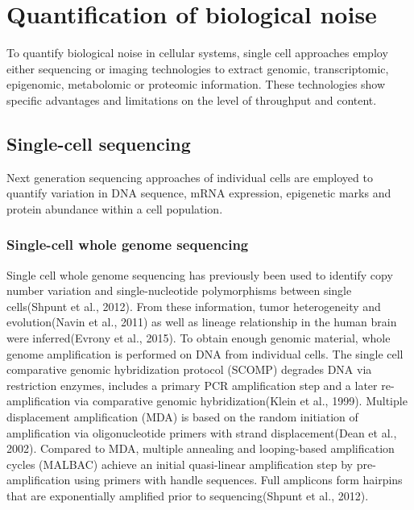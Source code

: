 
\section{Quantification of biological noise} 

To quantify biological noise in cellular systems, single cell approaches employ either sequencing or imaging technologies to extract genomic, transcriptomic, epigenomic, metabolomic or proteomic information. These technologies show specific advantages and limitations on the level of throughput and content.

\subsection{Single-cell sequencing}
Next generation sequencing approaches of individual cells are employed to quantify variation in DNA sequence, mRNA expression, epigenetic marks and protein abundance within a cell population. 

\subsubsection{Single-cell whole genome sequencing}
Single cell whole genome sequencing has previously been used to identify copy number variation and single-nucleotide polymorphisms between single cells(Shpunt et al., 2012). From these information, tumor heterogeneity and evolution(Navin et al., 2011) as well as lineage relationship in the human brain were inferred(Evrony et al., 2015). To obtain enough genomic material, whole genome amplification is performed on DNA from individual cells. The single cell comparative genomic hybridization protocol (SCOMP) degrades DNA via restriction enzymes, includes a primary PCR amplification step and a later re-amplification via comparative genomic hybridization(Klein et al., 1999). Multiple displacement amplification (MDA) is based on the random initiation of amplification via oligonucleotide primers with strand displacement(Dean et al., 2002). Compared to MDA, multiple annealing and looping-based amplification cycles (MALBAC) achieve an initial quasi-linear amplification step by pre-amplification using primers with handle sequences. Full amplicons form hairpins that are exponentially amplified prior to sequencing(Shpunt et al., 2012). 

